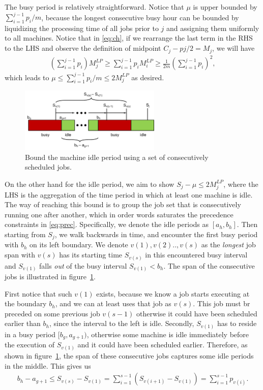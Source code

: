 The busy period is relatively straightforward. Notice that $\mu$ is upper bounded by $\sum_{i=1}^{j-1} p_i /m$, because the longest consecutive busy hour can be bounded by liquidizing the processing time of all jobs prior to $j$ and assigning them uniformly to all machines. Notice that in \eqref{eq:ch}, if we rearrange the last term in the RHS to the LHS and observe the definition of midpoint $C_j-pj/2 = M_j$, we will have 
\begin{align}
\left(\sum_{i=1}^{j-1}p_i\right)M^{LP}_j \geq \sum_{i=1}^{j-1} p_i M^{LP}_i \geq \frac{1}{2m}\left(\sum_{i=1}^{j-1}p_i\right)^2,
\end{align}
which leads to $\mu \leq \sum_{i=1}^{j-1} p_i /m \leq 2 M^{LP}_j$ as desired. 

\begin{figure}[h]
	\centering
	\includegraphics[width=0.6\textwidth]{figs/4-approx-1.pdf}
	\caption{Bound the machine idle period using a set of consecutively scheduled jobs.}
	\label{fig:4-approx}
\end{figure}

On the other hand for the idle period, we aim to show $S_j - \mu \leq 2 M^{LP}_j$, where the LHS is the aggregation of the time period in which at least one machine is idle. The way of reaching this bound is to group the job set that is consecutively running one after another, which in order words saturates the precedence constraints in \eqref{eq:prec}. Specifically, we denote the idle periods as $[a_h, b_h]$. Then starting from $S_j$, we walk backwards in time, and encounter the first busy period with $b_h$ on its left boundary. We denote $v(1), v(2) .., v(s)$ as the \emph{longest} job span with $v(s)$ has its starting time $S_{v(s)}$ in this encountered busy interval and $S_{v(1)}$ falls \emph{out} of the busy interval $S_{v(1)} < b_h$. The span of the consecutive jobs is illustrated in figure~\ref{fig:4-approx}. 

First notice that such $v(1)$ exists, because we know a job starts executing at the boundary $b_h$, and we can at least uses that job as $v(s)$. This job must br preceded on some previous job $v(s-1)$ otherwise it could have been scheduled earlier than $b_h$, since the interval to the left is idle. Secondly, $S_{v(1)}$ has to reside in a busy period $[b_g, a_{g+1})$, otherwise some machine is idle immediately before the execution of $S_{v(1)}$ and it could have been scheduled earlier. Therefore, as shown in figure~\ref{fig:4-approx}, the span of these consecutive jobs captures some idle periods in the middle. This gives us 
\begin{align}
b_h - a_{g+1} \leq S_{v(s)} - S_{v(1)} = \sum_{i=1}^{s-1}(S_{v(i+1)} - S_{v(1)}) = \sum_{i=1}^{s-1} p_{v(i)}. \label{eq:jobset}
\end{align}

